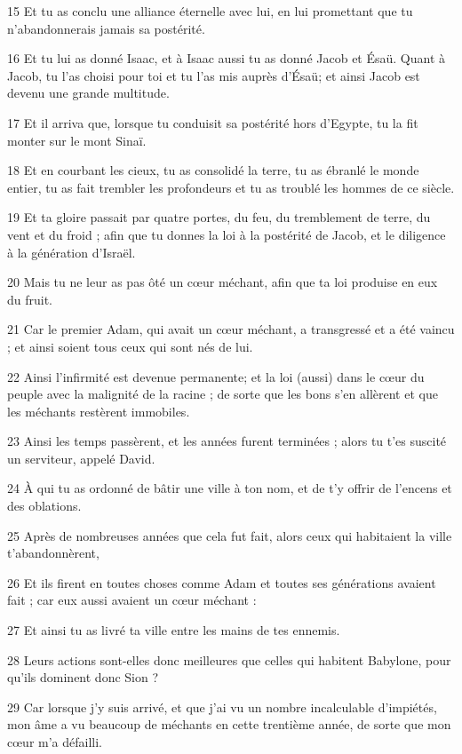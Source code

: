 \par 15 Et tu as conclu une alliance éternelle avec lui, en lui promettant que tu n'abandonnerais jamais sa postérité.
\par 16 Et tu lui as donné Isaac, et à Isaac aussi tu as donné Jacob et Ésaü. Quant à Jacob, tu l'as choisi pour toi et tu l'as mis auprès d'Ésaü; et ainsi Jacob est devenu une grande multitude.
\par 17 Et il arriva que, lorsque tu conduisit sa postérité hors d'Egypte, tu la fit monter sur le mont Sinaï.
\par 18 Et en courbant les cieux, tu as consolidé la terre, tu as ébranlé le monde entier, tu as fait trembler les profondeurs et tu as troublé les hommes de ce siècle.
\par 19 Et ta gloire passait par quatre portes, du feu, du tremblement de terre, du vent et du froid ; afin que tu donnes la loi à la postérité de Jacob, et le diligence à la génération d'Israël.
\par 20 Mais tu ne leur as pas ôté un cœur méchant, afin que ta loi produise en eux du fruit.
\par 21 Car le premier Adam, qui avait un cœur méchant, a transgressé et a été vaincu ; et ainsi soient tous ceux qui sont nés de lui.
\par 22 Ainsi l'infirmité est devenue permanente; et la loi (aussi) dans le cœur du peuple avec la malignité de la racine ; de sorte que les bons s'en allèrent et que les méchants restèrent immobiles.
\par 23 Ainsi les temps passèrent, et les années furent terminées ; alors tu t'es suscité un serviteur, appelé David.
\par 24 À qui tu as ordonné de bâtir une ville à ton nom, et de t'y offrir de l'encens et des oblations.
\par 25 Après de nombreuses années que cela fut fait, alors ceux qui habitaient la ville t'abandonnèrent,
\par 26 Et ils firent en toutes choses comme Adam et toutes ses générations avaient fait ; car eux aussi avaient un cœur méchant :
\par 27 Et ainsi tu as livré ta ville entre les mains de tes ennemis.
\par 28 Leurs actions sont-elles donc meilleures que celles qui habitent Babylone, pour qu'ils dominent donc Sion ?
\par 29 Car lorsque j'y suis arrivé, et que j'ai vu un nombre incalculable d'impiétés, mon âme a vu beaucoup de méchants en cette trentième année, de sorte que mon cœur m'a défailli.
